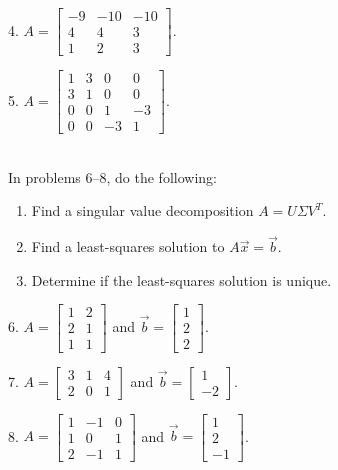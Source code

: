 \documentclass{article}
\begin{document}
4. $A = \left[\begin{array}{ccc} -9& -10& -10 \\ 4& 4& 3 \\ 1& 2& 3 \end{array}\right]$.

5. $A = \left[\begin{array}{cccc} 1& 3& 0& 0 \\ 3& 1& 0& 0 \\ 0& 0& 1& -3 \\ 0& 0& -3& 1 \end{array}\right]$.

~\\

In problems 6--8, do the following:

\begin{enumerate}

	\item Find a singular value decomposition $A = U \Sigma V^T$.

	\item Find a least-squares solution to $A\vec{x} = \vec{b}$.

	\item Determine if the least-squares solution is unique.

\end{enumerate}

6. $A = \left[\begin{array}{cc} 1& 2 \\ 2& 1 \\ 1& 1 \end{array}\right]$ and $\vec{b} = \left[\begin{array}{c} 1 \\ 2 \\ 2 \end{array}\right]$.

7. $A = \left[\begin{array}{ccc} 3& 1& 4 \\ 2& 0& 1 \end{array}\right]$ and $\vec{b} = \left[\begin{array}{c} 1 \\ -2 \end{array}\right]$.

8. $A = \left[\begin{array}{ccc} 1& -1& 0 \\ 1& 0& 1 \\ 2& -1& 1 \end{array}\right]$ and $\vec{b} = \left[\begin{array}{c} 1 \\ 2 \\ -1 \end{array}\right]$.
\end{document}
